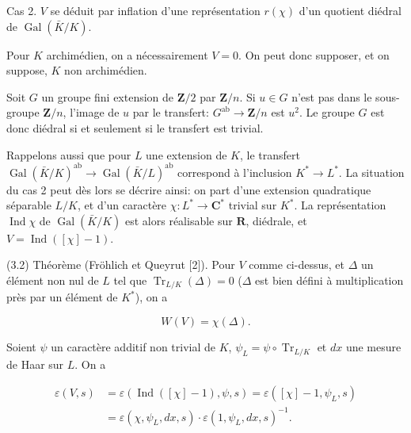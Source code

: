 \documentclass[9pt,twoside]{extarticle}
\begin{document}
{Cas 2. \(V\) se déduit par inflation d’une représentation \(r(\chi)\) d’un quotient diédral de \(\operatorname{Gal}(\bar K/K)\).\par

Pour \(K\) archimédien, on a nécessairement \(V=0\). On peut donc supposer, et on suppose, \(K\) non archimédien.\par

Soit \(G\) un groupe fini extension de \(\mathbf Z/2\) par \(\mathbf Z/n\). Si \(u\in G\) n’est pas dans le sous-groupe \(\mathbf Z/n\), l’image de \(u\) par le transfert: \(G^{\mathrm{ab}}\to\mathbf Z/n\) est \(u^2\). Le groupe \(G\) est donc diédral si et seulement si le transfert est trivial.\par

Rappelons aussi que pour \(L\) une extension de \(K\), le transfert \(\operatorname{Gal}(\bar K/K)^{\mathrm{ab}}\to\operatorname{Gal}(\bar K/L)^{\mathrm{ab}}\) correspond à l’inclusion \(K^*\to L^*\). La situation du cas 2 peut dès lors se décrire ainsi: on part d’une extension quadratique séparable \(L/K\), et d’un caractère \(\chi:L^*\to\mathbf C^*\) trivial sur \(K^*\). La représentation \(\operatorname{Ind}\chi\) de \(\operatorname{Gal}(\bar K/K)\) est alors réalisable sur \(\mathbf R\), diédrale, et \(V=\operatorname{Ind}([\chi]-1)\).\par

(3.2) Théorème (Fröhlich et Queyrut [2]). Pour \(V\) comme ci-dessus, et \(\Delta\) un élément non nul de \(L\) tel que \(\operatorname{Tr}_{L/K}(\Delta)=0\) (\(\Delta\) est bien défini à multiplication près par un élément de \(K^*\)), on a\par

\[
W(V)=\chi(\Delta).
\]

Soient \(\psi\) un caractère additif non trivial de \(K\), \(\psi_L=\psi\circ\operatorname{Tr}_{L/K}\) et \(dx\) une mesure de Haar sur \(L\). On a\par

\[
\begin{aligned}
\varepsilon(V,s)
&=\varepsilon(\operatorname{Ind}([\chi]-1),\psi,s)
 =\varepsilon([\chi]-1,\psi_L,s)\\
&=\varepsilon(\chi,\psi_L,dx,s)\cdot\varepsilon(1,\psi_L,dx,s)^{-1}.
\end{aligned}
\]
}
\end{document}
